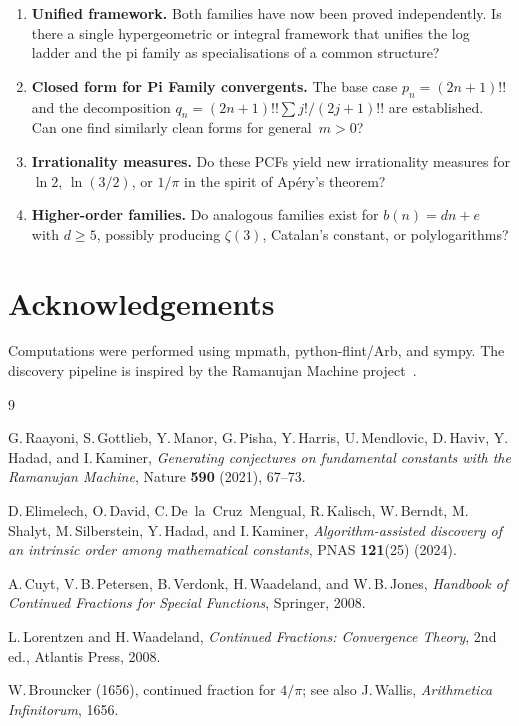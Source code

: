 \documentclass[11pt,a4paper]{article}
\theoremstyle{plain}
\theoremstyle{remark}
\begin{document}
\begin{enumerate}
\item \textbf{Unified framework.}
  Both families have now been proved independently.
  Is there a single hypergeometric or integral framework that
  unifies the log ladder and the pi family as specialisations
  of a common structure?

\item \textbf{Closed form for Pi Family convergents.}
  The base case $p_n = (2n{+}1)!!$ and the decomposition
  $q_n = (2n{+}1)!!\sum j!/(2j{+}1)!!$ are established.
  Can one find similarly clean forms for general~$m > 0$?

\item \textbf{Irrationality measures.}
  Do these PCFs yield new irrationality measures for $\ln 2$,
  $\ln(3/2)$, or $1/\pi$ in the spirit of Ap\'ery's theorem?

\item \textbf{Higher-order families.}
  Do analogous families exist for $b(n) = dn + e$ with $d \ge 5$,
  possibly producing $\zeta(3)$, Catalan's constant, or polylogarithms?
\end{enumerate}

\section*{Acknowledgements}

Computations were performed using mpmath, python-flint/Arb, and sympy.
The discovery pipeline is inspired by the Ramanujan Machine
project~\cite{raayoni2021,elimelech2024}.

\begin{thebibliography}{9}

G.\,Raayoni, S.\,Gottlieb, Y.\,Manor, G.\,Pisha, Y.\,Harris,
U.\,Mendlovic, D.\,Haviv, Y.\,Hadad, and I.\,Kaminer,
\emph{Generating conjectures on fundamental constants with the
Ramanujan Machine},
Nature \textbf{590} (2021), 67--73.

D.\,Elimelech, O.\,David, C.\,De~la~Cruz~Mengual, R.\,Kalisch,
W.\,Berndt, M.\,Shalyt, M.\,Silberstein, Y.\,Hadad,
and I.\,Kaminer,
\emph{Algorithm-assisted discovery of an intrinsic order among
mathematical constants},
PNAS \textbf{121}(25) (2024).

A.\,Cuyt, V.\,B.\,Petersen, B.\,Verdonk, H.\,Waadeland,
and W.\,B.\,Jones,
\emph{Handbook of Continued Fractions for Special Functions},
Springer, 2008.

L.\,Lorentzen and H.\,Waadeland,
\emph{Continued Fractions: Convergence Theory},
2nd ed., Atlantis Press, 2008.

W.\,Brouncker (1656), continued fraction for $4/\pi$;
see also J.\,Wallis, \emph{Arithmetica Infinitorum}, 1656.

\end{thebibliography}
\end{document}
